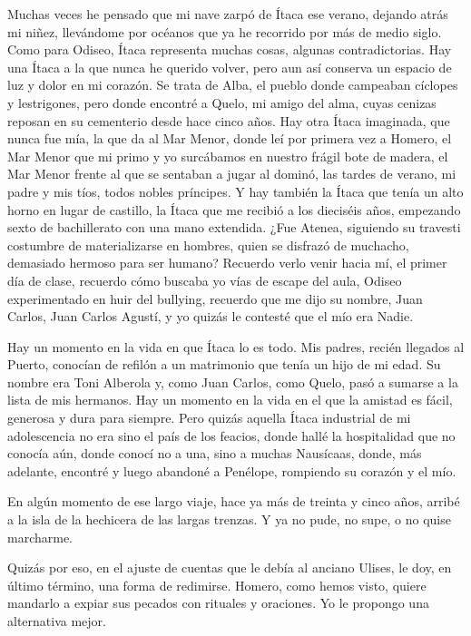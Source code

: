 Muchas veces he pensado que mi nave zarpó de Ítaca ese verano, dejando atrás mi niñez, llevándome por océanos que ya he recorrido por más de medio siglo. Como para Odiseo, Ítaca representa muchas cosas, algunas contradictorias. Hay una Ítaca a la que nunca he querido volver, pero aun así conserva un espacio de luz y dolor en mi corazón. Se trata de Alba, el pueblo donde campeaban cíclopes y lestrigones, pero donde encontré a Quelo, mi amigo del alma, cuyas cenizas reposan en su cementerio desde hace cinco años. Hay otra Ítaca imaginada, que nunca fue mía, la que da al Mar Menor, donde leí por primera vez a Homero, el Mar Menor que mi primo y yo surcábamos en nuestro frágil bote de madera, el Mar Menor frente al que se sentaban a jugar al dominó, las tardes de verano, mi padre y mis tíos, todos nobles príncipes. Y hay también la Ítaca que tenía un alto horno en lugar de castillo, la Ítaca que me recibió a los dieciséis años, empezando sexto de bachillerato con una mano extendida. ¿Fue Atenea, siguiendo su travesti costumbre de materializarse en hombres, quien se disfrazó de muchacho, demasiado hermoso para ser humano? Recuerdo verlo venir hacia mí, el primer día de clase, recuerdo cómo buscaba yo vías de escape del aula, Odiseo experimentado en huir del bullying, recuerdo que me dijo su nombre, Juan Carlos, Juan Carlos Agustí, y yo quizás le contesté que el mío era Nadie.

Hay un momento en la vida en que Ítaca lo es todo. Mis padres, recién llegados al Puerto, conocían de refilón a un matrimonio que tenía un hijo de mi edad. Su nombre era Toni Alberola y, como Juan Carlos, como Quelo, pasó a sumarse a la lista de mis hermanos. Hay un momento en la vida en el que la amistad es fácil, generosa y dura para siempre. Pero quizás aquella Ítaca industrial de mi adolescencia no era sino el país de los feacios, donde hallé la hospitalidad que no conocía aún, donde conocí no a una, sino a muchas Nausícaas, donde, más adelante, encontré y luego abandoné a Penélope, rompiendo su corazón y el mío.

En algún momento de ese largo viaje, hace ya más de treinta y cinco años, arribé a la isla de la hechicera de las largas trenzas. Y ya no pude, no supe, o no quise marcharme.

Quizás por eso, en el ajuste de cuentas que le debía al anciano Ulises, le doy, en último término, una forma de redimirse. Homero, como hemos visto, quiere mandarlo a expiar sus pecados con rituales y oraciones. Yo le propongo una alternativa mejor.



